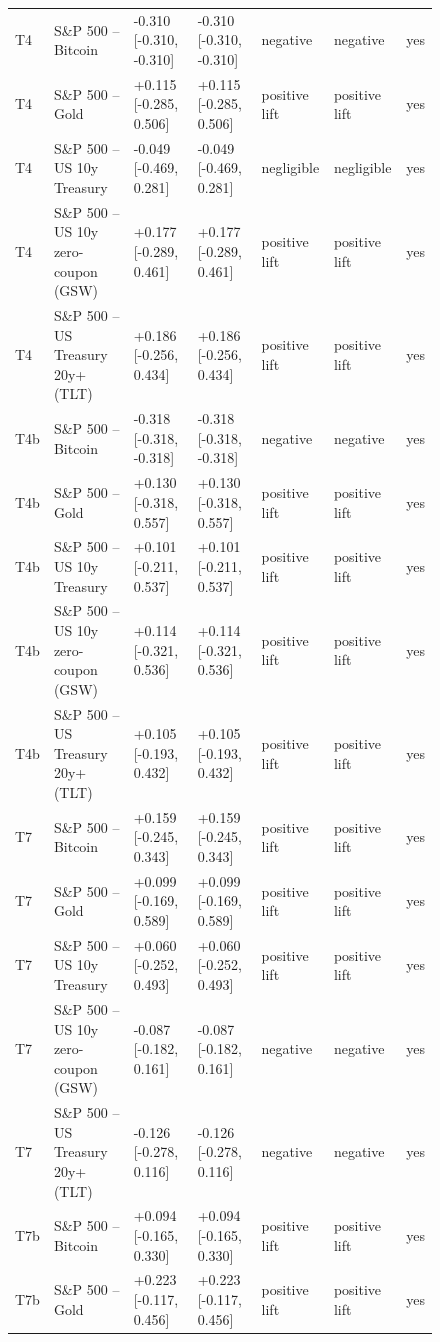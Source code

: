 \begin{figure}[t]
{\begin{tabular}{lllllll}
T4 & S\&P 500 -- Bitcoin & -0.310 [-0.310, -0.310] & -0.310 [-0.310, -0.310] & negative & negative & yes \\
T4 & S\&P 500 -- Gold & +0.115 [-0.285, 0.506] & +0.115 [-0.285, 0.506] & positive lift & positive lift & yes \\
T4 & S\&P 500 -- US 10y Treasury & -0.049 [-0.469, 0.281] & -0.049 [-0.469, 0.281] & negligible & negligible & yes \\
T4 & S\&P 500 -- US 10y zero-coupon (GSW) & +0.177 [-0.289, 0.461] & +0.177 [-0.289, 0.461] & positive lift & positive lift & yes \\
T4 & S\&P 500 -- US Treasury 20y+ (TLT) & +0.186 [-0.256, 0.434] & +0.186 [-0.256, 0.434] & positive lift & positive lift & yes \\
T4b & S\&P 500 -- Bitcoin & -0.318 [-0.318, -0.318] & -0.318 [-0.318, -0.318] & negative & negative & yes \\
T4b & S\&P 500 -- Gold & +0.130 [-0.318, 0.557] & +0.130 [-0.318, 0.557] & positive lift & positive lift & yes \\
T4b & S\&P 500 -- US 10y Treasury & +0.101 [-0.211, 0.537] & +0.101 [-0.211, 0.537] & positive lift & positive lift & yes \\
T4b & S\&P 500 -- US 10y zero-coupon (GSW) & +0.114 [-0.321, 0.536] & +0.114 [-0.321, 0.536] & positive lift & positive lift & yes \\
T4b & S\&P 500 -- US Treasury 20y+ (TLT) & +0.105 [-0.193, 0.432] & +0.105 [-0.193, 0.432] & positive lift & positive lift & yes \\
T7 & S\&P 500 -- Bitcoin & +0.159 [-0.245, 0.343] & +0.159 [-0.245, 0.343] & positive lift & positive lift & yes \\
T7 & S\&P 500 -- Gold & +0.099 [-0.169, 0.589] & +0.099 [-0.169, 0.589] & positive lift & positive lift & yes \\
T7 & S\&P 500 -- US 10y Treasury & +0.060 [-0.252, 0.493] & +0.060 [-0.252, 0.493] & positive lift & positive lift & yes \\
T7 & S\&P 500 -- US 10y zero-coupon (GSW) & -0.087 [-0.182, 0.161] & -0.087 [-0.182, 0.161] & negative & negative & yes \\
T7 & S\&P 500 -- US Treasury 20y+ (TLT) & -0.126 [-0.278, 0.116] & -0.126 [-0.278, 0.116] & negative & negative & yes \\
T7b & S\&P 500 -- Bitcoin & +0.094 [-0.165, 0.330] & +0.094 [-0.165, 0.330] & positive lift & positive lift & yes \\
T7b & S\&P 500 -- Gold & +0.223 [-0.117, 0.456] & +0.223 [-0.117, 0.456] & positive lift & positive lift & yes \\

\end{tabular}}
\end{figure}
